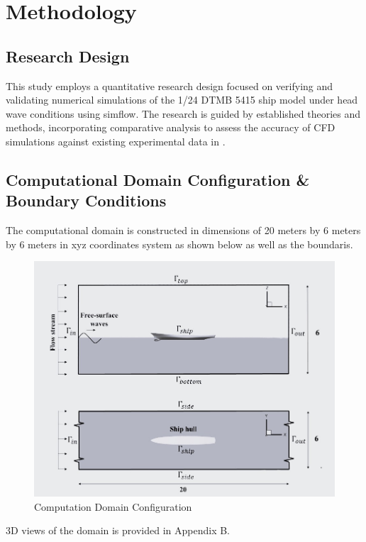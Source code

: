 \documentclass[12pt]{article} %
\begin{document}


\newpage
\section{Methodology}

\subsection{Research Design}
This study employs a quantitative research design focused on verifying and validating numerical 
simulations of the 1/24 DTMB 5415 ship model under head wave conditions using simflow. The research 
is guided by established theories and methods, incorporating comparative analysis to assess the 
accuracy of CFD simulations against existing experimental data in \cite{Begovic2017}.

\subsection{Computational Domain Configuration \& Boundary Conditions}

The computational domain is constructed in dimensions of 20 meters by 6 meters by 6 meters in xyz coordinates 
system as shown below as well as the boundaris.
\begin{figure}[ht]
    \centering
    \includegraphics[width=1\textwidth]{Domain.jpg}
    \caption{Computation Domain Configuration}
\end{figure}
3D views of the domain is provided in Appendix B.
\end{document}
